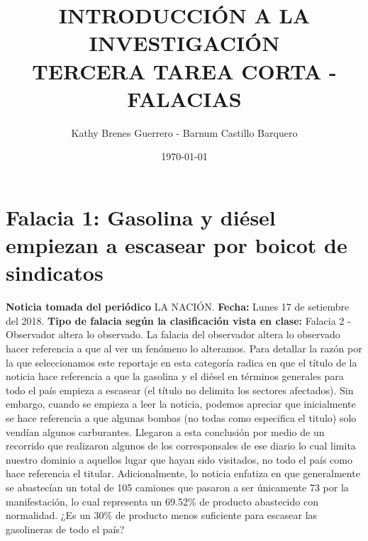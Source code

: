 \documentclass[11pt,a4paper,titlepage]{article}
\title{\blue INTRODUCCI\'ON A LA INVESTIGACI\'ON \\
\blueb TERCERA TAREA CORTA - FALACIAS}
\author{Kathy Brenes Guerrero - Barnum Castillo Barquero}
\date{\today}
\begin{document}
\maketitle

\section{Falacia 1: Gasolina y diésel empiezan a escasear por boicot de sindicatos }{%
\textbf{Noticia tomada del periódico} LA NACIÓN.
\newline
\textbf{Fecha:} Lunes 17 de setiembre del 2018.
\newline
\textbf{Tipo de falacia según la clasificación vista en clase:} 
\newline
Falacia 2 - Observador altera lo observado.
\newline
\newline
La falacia del observador altera lo observado hacer referencia a que al ver un fen\'omeno lo alteramos.
\newline
Para detallar la raz\'on por la que seleccionamos este reportaje en esta categor\'ia radica en que el título de la noticia hace referencia a que la gasolina y el diésel en términos generales para todo el país empieza a escasear (el t\'itulo no delimita los sectores afectados). Sin embargo, cuando se empieza a leer la noticia, podemos apreciar que inicialmente se hace referencia a que algunas bombas (no todas como especifica el titulo) solo vend\'ian algunos carburantes. Llegaron a esta conclusión por medio de un recorrido que realizaron algunos de los corresponsales de ese diario lo cual limita nuestro dominio a aquellos lugar que hayan sido visitados, no todo el país como hace referencia el titular.
\newline
Adicionalmente, lo noticia enfatiza en que generalmente se abastec\'ian un total de 105 camiones que pasaron a ser \'unicamente 73 por la manifestaci\'on, lo cual representa un 69.52\% de producto abastecido con normalidad. ¿Es un 30\% de producto menos suficiente para escasear las gasolineras de todo el pa\'is?

}
\end{document}
